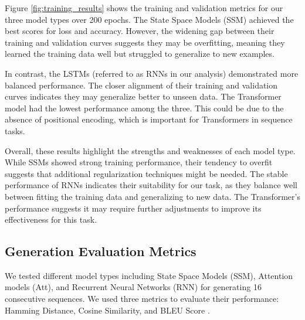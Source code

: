 \documentclass[10pt,a4paper]{article}
\begin{document}
Figure \ref{fig:training_results} shows the training and validation metrics for our three model types over 200 epochs. The State Space Models (SSM) achieved the best scores for loss and accuracy. However, the widening gap between their training and validation curves suggests they may be overfitting, meaning they learned the training data well but struggled to generalize to new examples.

In contrast, the LSTMs (referred to as RNNs in our analysis) demonstrated more balanced performance. The closer alignment of their training and validation curves indicates they may generalize better to unseen data. The Transformer model had the lowest performance among the three. This could be due to the absence of positional encoding, which is important for Transformers in sequence tasks.

Overall, these results highlight the strengths and weaknesses of each model type. While SSMs showed strong training performance, their tendency to overfit suggests that additional regularization techniques might be needed. The stable performance of RNNs indicates their suitability for our task, as they balance well between fitting the training data and generalizing to new data. The Transformer's performance suggests it may require further adjustments to improve its effectiveness for this task.

\subsection{Generation Evaluation Metrics}

We tested different model types including State Space Models (SSM), Attention models (Att), and Recurrent Neural Networks (RNN) for generating 16 consecutive sequences. We used three metrics to evaluate their performance: Hamming Distance, Cosine Similarity, and BLEU Score \cite{sutskever2014sequence, hamming1950error, papineni2002bleu}.
\end{document}
